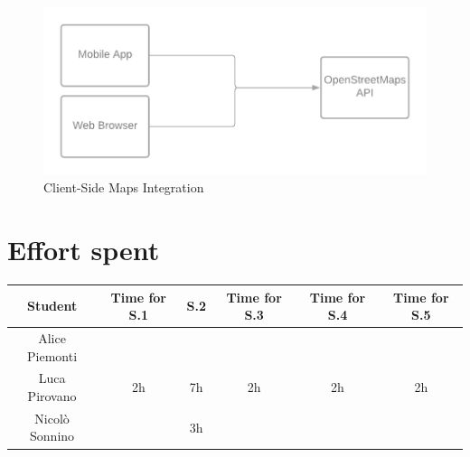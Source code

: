 \documentclass[table, 12pt]{article}
\begin{document}
\begin{center}
    \begin{figure}[H]
        \includegraphics[width=\textwidth]{assets/IT-Plan/OpenStreetMaps.png}
        \caption{Client-Side Maps Integration}\label{maps_api}
    \end{figure}
\end{center}


\pagestyle{plain}

\section{Effort spent}
\begin{tabular}{ | c || c | c | c | c| c|}
    \hline
    Student        & Time for S.1 & S.2 & Time for S.3 & Time for S.4 & Time for S.5 \\ \hline
    Alice Piemonti &              &     &              &              &              \\ \hline
    Luca Pirovano  & 2h           & 7h  & 2h           & 2h           & 2h           \\ \hline
    Nicolò Sonnino &              & 3h  &              &              &              \\
    \hline
\end{tabular}
\end{document}
